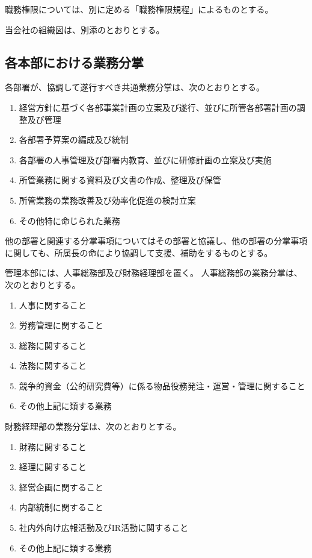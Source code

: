 \documentclass[10pt,a4paper,uplatex,dvipdfmx]{jsarticle}
\begin{document}
職務権限については、別に定める「職務権限規程」によるものとする。

当会社の組織図は、別添のとおりとする。

\subsection{各本部における業務分掌}
各部署が、協調して遂行すべき共通業務分掌は、次のとおりとする。
\begin{enumerate}
	\item 経営方針に基づく各部事業計画の立案及び遂行、並びに所管各部署計画の調整及び管理
	\item 各部署予算案の編成及び統制
	\item 各部署の人事管理及び部署内教育、並びに研修計画の立案及び実施
	\item 所管業務に関する資料及び文書の作成、整理及び保管
	\item 所管業務の業務改善及び効率化促進の検討立案
	\item その他特に命じられた業務
\end{enumerate}
\term 他の部署と関連する分掌事項についてはその部署と協議し、他の部署の分掌事項に関しても、所属長の命により協調して支援、補助をするものとする。

管理本部には、人事総務部及び財務経理部を置く。
\term 人事総務部の業務分掌は、次のとおりとする。
\begin{enumerate}
	\item 人事に関すること
	\item 労務管理に関すること
	\item 総務に関すること
	\item 法務に関すること
	\item 競争的資金（公的研究費等）に係る物品役務発注・運営・管理に関すること
	\item その他上記に類する業務
\end{enumerate}

\term 財務経理部の業務分掌は、次のとおりとする。
\begin{enumerate}
	\item 財務に関すること
	\item 経理に関すること
	\item 経営企画に関すること
	\item 内部統制に関すること
	\item 社内外向け広報活動及びIR活動に関すること
	\item その他上記に類する業務
\end{enumerate}
\end{document}
